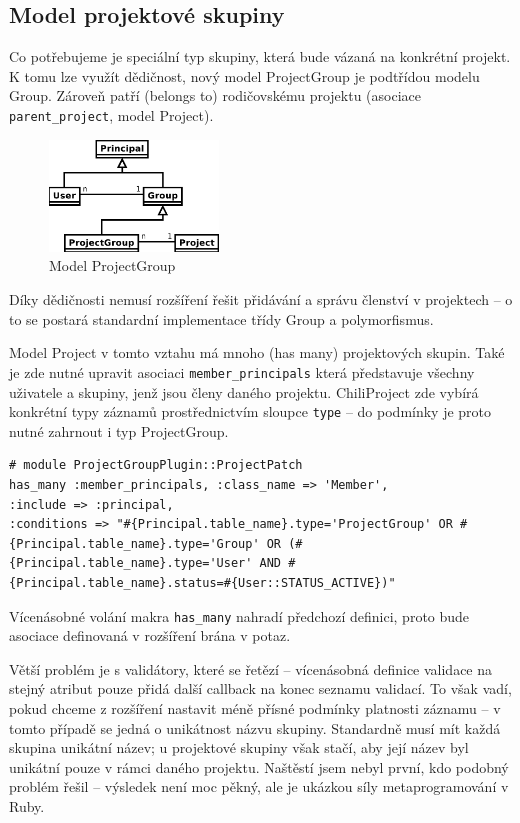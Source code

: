 \documentclass[thesis=B,czech]{FITthesis}[2012/05/02]
\begin{document}
\subsection{Model projektové skupiny}

Co potřebujeme je speciální typ skupiny, která bude vázaná na konkrétní
projekt. K tomu lze využít dědičnost, nový model ProjectGroup je
podtřídou modelu Group. Zároveň patří (belongs to) rodičovskému projektu
(asociace \lstinline!parent_project!, model Project).

\begin{figure}[bp]
\centering
\includegraphics[width=0.4\textwidth]{group-er3.pdf}
\caption{Model ProjectGroup}
\end{figure}

Díky dědičnosti nemusí rozšíření řešit přidávání a správu členství
v projektech -- o to se postará standardní implementace třídy Group a
polymorfismus.

Model Project v tomto vztahu má mnoho (has many) projektových skupin.
Také je zde nutné upravit asociaci \lstinline!member_principals! která
představuje všechny uživatele a skupiny, jenž jsou členy daného projektu.
ChiliProject zde vybírá konkrétní typy záznamů prostřednictvím sloupce
\lstinline!type! -- do podmínky je proto nutné zahrnout i typ
ProjectGroup.

\begin{lstlisting}
# module ProjectGroupPlugin::ProjectPatch
has_many :member_principals, :class_name => 'Member',
:include => :principal,
:conditions => "#{Principal.table_name}.type='ProjectGroup' OR #{Principal.table_name}.type='Group' OR (#{Principal.table_name}.type='User' AND #{Principal.table_name}.status=#{User::STATUS_ACTIVE})"
\end{lstlisting}
Vícenásobné volání makra \lstinline!has_many! nahradí předchozí
definici, proto bude asociace definovaná v rozšíření brána v potaz.

Větší problém je s validátory, které se řetězí -- vícenásobná definice
validace na stejný atribut pouze přidá další \gls{callback} na konec
seznamu validací. To však vadí, pokud chceme z rozšíření nastavit méně
přísné podmínky platnosti záznamu -- v tomto případě se jedná
o unikátnost názvu skupiny. Standardně musí mít každá skupina unikátní
název; u projektové skupiny však stačí, aby její název byl unikátní pouze v rámci daného
projektu. Naštěstí jsem nebyl první, kdo podobný problém řešil
\citep{McAlpin2011} -- výsledek není moc pěkný, ale je ukázkou síly
metaprogramování v Ruby.
\end{document}
